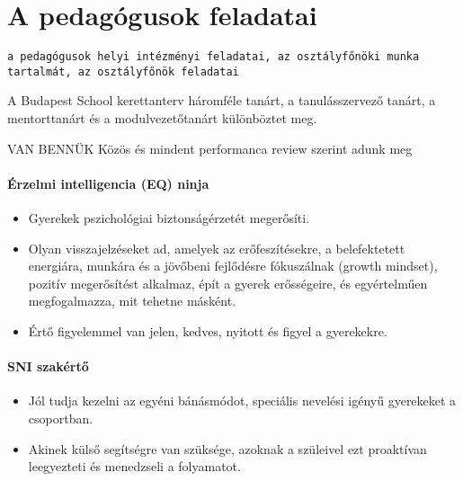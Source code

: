 


\section{A pedagógusok feladatai}\label{a-pedaguxf3gusok-feladatai}

\begin{verbatim}
a pedagógusok helyi intézményi feladatai, az osztályfőnöki munka tartalmát, az osztályfőnök feladatai
\end{verbatim}

A Budapest School kerettanterv háromféle tanárt, a tanulásszervező
tanárt, a mentorttanárt és a modulvezetőtanárt különböztet meg.

VAN BENNÜK Közös és mindent performanca review szerint adunk meg



\paragraph{Érzelmi intelligencia (EQ)
ninja}\label{uxe9rzelmi-intelligencia-eq-ninja}

\begin{itemize}

\item
  Gyerekek pszichológiai biztonságérzetét megerősíti.
\item
  Olyan visszajelzéseket ad, amelyek az erőfeszítésekre, a belefektetett
  energiára, munkára és a jövőbeni fejlődésre fókuszálnak (growth
  mindset), pozitív megerősítést alkalmaz, épít a gyerek erősségeire, és
  egyértelműen megfogalmazza, mit tehetne másként.
\item
  Értő figyelemmel van jelen, kedves, nyitott és figyel a gyerekekre.
\end{itemize}

\paragraph{SNI szakértő}\label{sni-szakuxe9rtux151}

\begin{itemize}

\item
  Jól tudja kezelni az egyéni bánásmódot, speciális nevelési igényű
  gyerekeket a csoportban.
\item
  Akinek külső segítségre van szüksége, azoknak a szüleivel ezt
  proaktívan leegyezteti és menedzseli a folyamatot.
\end{itemize}

